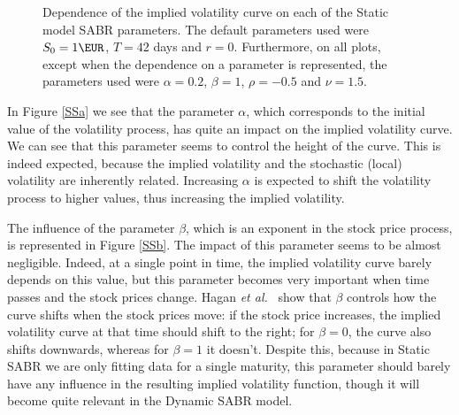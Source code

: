 \begin{figure}[H]
  \begin{subfigmatrix}{2}
  \end{subfigmatrix}
  \caption[Dependence of the implied volatility curve on each of the Static SABR model parameters.]{Dependence of the implied volatility curve on each of the Static model SABR parameters. The default parameters used were $S_0=1\EUR$, $T=42$ days and $r=0$. Furthermore, on all plots, except when the dependence on a parameter is represented, the parameters used were $\alpha=0.2$, $\beta=1$, $\rho=-0.5$ and $\nu=1.5$.}
  \label{fig:SSparam}
\end{figure}

In Figure \autoref{SSa} we see that the parameter $\alpha$, which corresponds to the initial value of the volatility process, has quite an impact on the implied volatility curve. We can see that this parameter seems to control the height of the curve. This is indeed expected, because the implied volatility and the stochastic (local) volatility are inherently related. Increasing $\alpha$ is expected to shift the volatility process to higher values, thus increasing the implied volatility.

The influence of the parameter $\beta$, which is an exponent in the stock price process, is represented in Figure \autoref{SSb}. The impact of this parameter seems to be almost negligible. Indeed, at a single point in time, the implied volatility curve barely depends on this value, but this parameter becomes very important when time passes and the stock prices change. Hagan \textit{et al.}~\citep{Hagan} show that $\beta$ controls how the curve shifts when the stock prices move: if the stock price increases, the implied volatility curve at that time should shift to the right; for $\beta=0$, the curve also shifts downwards, whereas for $\beta=1$ it doesn't.
Despite this, because in Static SABR we are only fitting data for a single maturity, this parameter should barely have any influence in the resulting implied volatility function, though it will become quite relevant in the Dynamic SABR model.

